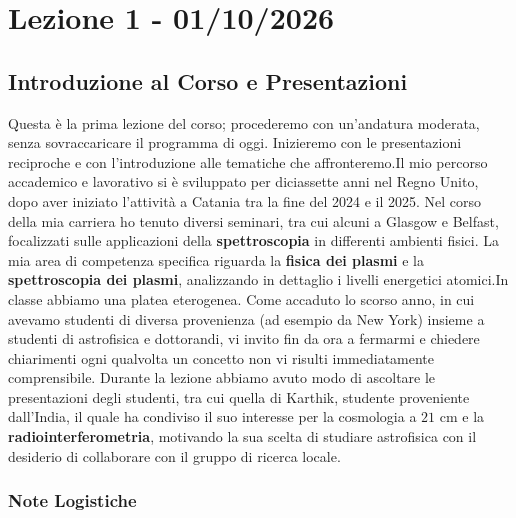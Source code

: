 \chapter{Lezione 1 - 01/10/2026}

\section{Introduzione al Corso e Presentazioni}

Questa è la prima lezione del corso; procederemo con un'andatura moderata, senza sovraccaricare il programma di oggi. Inizieremo con le presentazioni reciproche e con l'introduzione alle tematiche che affronteremo.Il mio percorso accademico e lavorativo si è sviluppato per diciassette anni nel Regno Unito, dopo aver iniziato l'attività a Catania tra la fine del 2024 e il 2025. Nel corso della mia carriera ho tenuto diversi seminari, tra cui alcuni a Glasgow e Belfast, focalizzati sulle applicazioni della \textbf{spettroscopia} in differenti ambienti fisici. La mia area di competenza specifica riguarda la \textbf{fisica dei plasmi} e la \textbf{spettroscopia dei plasmi}, analizzando in dettaglio i livelli energetici atomici.In classe abbiamo una platea eterogenea. Come accaduto lo scorso anno, in cui avevamo studenti di diversa provenienza (ad esempio da New York) insieme a studenti di astrofisica e dottorandi, vi invito fin da ora a fermarmi e chiedere chiarimenti ogni qualvolta un concetto non vi risulti immediatamente comprensibile. Durante la lezione abbiamo avuto modo di ascoltare le presentazioni degli studenti, tra cui quella di Karthik, studente proveniente dall'India, il quale ha condiviso il suo interesse per la cosmologia a $21\text{ cm}$ e la \textbf{radiointerferometria}, motivando la sua scelta di studiare astrofisica con il desiderio di collaborare con il gruppo di ricerca locale.

    \subsection{Note Logistiche}
    

